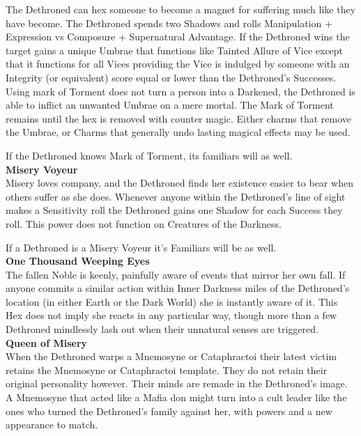 \noindent The Dethroned can hex someone to become a magnet for suffering much like they have become. The Dethroned spends two Shadows and rolls Manipulation + Expression vs Composure + Supernatural Advantage. If the Dethroned wins the target gains a unique Umbrae that functions like Tainted Allure of Vice except that it functions for all Vices providing the Vice is indulged by someone with an Integrity (or equivalent) score equal or lower than the Dethroned's Successes. Using mark of Torment does not turn a person into a Darkened, the Dethroned is able to inflict an unwanted Umbrae on a mere mortal. The Mark of Torment remains until the hex is removed with counter magic. Either charms that remove the Umbrae, or Charms that generally undo lasting magical effects may be used.

If the Dethroned knows Mark of Torment, its familiars will as well.\\

\noindent \textbf{Misery Voyeur}\\

\noindent Misery loves company, and the Dethroned finds her existence easier to bear when others suffer as she does. Whenever anyone within the Dethroned's line of sight makes a Sensitivity roll the Dethroned gains one Shadow for each Success they roll. This power does not function on Creatures of the Darkness.

If a Dethroned is a Misery Voyeur it's Familiars will be as well. \\

\noindent \textbf{One Thousand Weeping Eyes}\\

\noindent The fallen Noble is keenly, painfully aware of events that mirror her own fall. If anyone commits a similar action within Inner Darkness miles of the Dethroned's location (in either Earth or the Dark World) she is instantly aware of it. This Hex does not imply she reacts in any particular way, though more than a few Dethroned mindlessly lash out when their unnatural senses are triggered.\\

\noindent \textbf{Queen of Misery}\\

When the Dethroned warps a Mnemosyne or Cataphractoi their latest victim retains the Mnemosyne or Cataphractoi template. They do not retain their original personality however. Their minds are remade in the Dethroned's image. A Mnemosyne that acted like a Mafia don might turn into a cult leader like the ones who turned the Dethroned's family against her, with powers and a new appearance to match.

